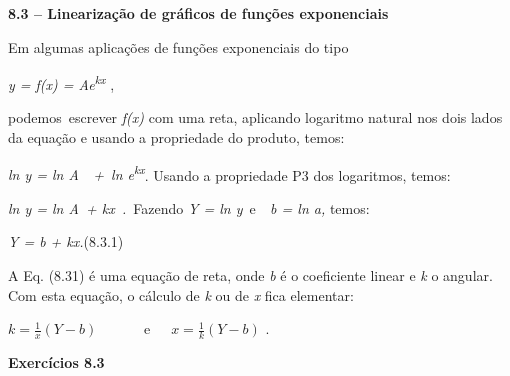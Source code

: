 \documentclass[12pt]{article}
\begin{document}
\vspace{\baselineskip}

\vspace{\baselineskip}
{\fontsize{14pt}{16.8pt}\selectfont \textbf{8.3 – Linearização de gráficos de funções exponenciais}\par}\par


\vspace{\baselineskip}
Em algumas aplicações de funções exponenciais do tipo \par


\vspace{\baselineskip}
 \textit{y = f(x) = Ae\textsuperscript{kx}} , \par


\vspace{\baselineskip}
podemos\ escrever  \textit{f(x)} com uma reta, aplicando logaritmo natural nos dois lados da equação e usando a propriedade do produto, temos:\par


\vspace{\baselineskip}
\textit{ln y = ln A\ \ +\   ln e\textsuperscript{kx}}. Usando a propriedade P3 dos logaritmos, temos:\par


\vspace{\baselineskip}
\textit{ln y = ln A\  + kx\ .\   }Fazendo\textit{ Y = ln y\  }e\textit{\ \ b =  ln a, }temos:\par


\vspace{\baselineskip}
\textit{Y = b + kx.\tab \tab \tab \tab \tab \tab \tab \tab \tab }(8.3.1)\par


\vspace{\baselineskip}
A Eq. (8.31) é uma equação de reta, onde \textit{b} é o coeficiente linear e \textit{k} o angular. Com esta equação, o cálculo de \textit{k} ou de \textit{x} fica elementar:\par


\vspace{\baselineskip}
 \( k=\frac{1}{x} \left( Y-b \right)  \) \ \ \ \ \ \  e\ \ \   \( x=\frac{1}{k} \left( Y-b \right)  \) .\par


\vspace{\baselineskip}
\textbf{Exercícios 8.3}\par
\end{document}
